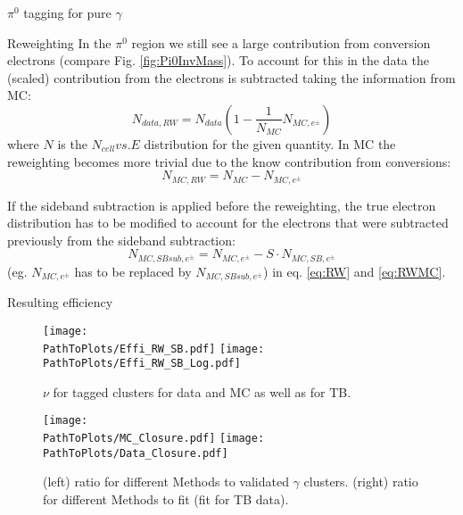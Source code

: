 \documentclass[ALICE]{ALICE_analysis_notes}
\newcommand{\PZ}{$\pi^0$\xspace}
\newcommand{\g}{$\gamma$\xspace}
\newcommand{\PathToPlots}{/home/joshua/PCG_Software/EMCal_NCellEffi/13TeVNomB_Wide/Pi0Tagging_13TeV_nom_04_26_WithTRD_WithBorderCells_1cellFT/pdf}
\begin{document}
\begin{section}{\PZ tagging for pure \g}
\begin{subsection}{Reweighting}
	In the \PZ region we still see a large contribution from conversion electrons (compare Fig. \ref{fig:Pi0InvMass}). To account for this in the data the (scaled) contribution from the electrons is subtracted taking the information from MC:
	\begin{equation}
		N_{data, RW} = N_{data} ( 1 - \frac{1}{N_{MC}} N_{MC, e^{\pm}} )
		\label{eq:RW}
	\end{equation}
	where $N$ is the $N_{cell} vs. E$ distribution for the given quantity.
	In MC the reweighting becomes more trivial due to the know contribution from conversions:
	\begin{equation}
	N_{MC, RW} = N_{MC} - N_{MC, e^{\pm}}
	\label{eq:RWMC}
	\end{equation}
	
	
	If the sideband subtraction is applied before the reweighting, the true electron distribution has to be modified to account for the electrons that were subtracted previously from the sideband subtraction: \\
	\begin{equation}
	N_{MC, SB sub, e^{\pm}} = N_{MC, e^{\pm}} - S \cdot N_{MC, SB, e^{\pm}}
	\end{equation}
	(eg. $N_{MC, e^{\pm}}$ has to be replaced by $N_{MC, SB sub, e^{\pm}}$) in eq. \ref{eq:RW} and \ref{eq:RWMC}.
	
	
	
\end{subsection}

\begin{subsection}{Resulting efficiency}
	
	\begin{figure}[ht!]
		\centering
		\texttt{[image: \\PathToPlots/Effi\_RW\_SB.pdf]}
		\texttt{[image: \\PathToPlots/Effi\_RW\_SB\_Log.pdf]}
		
		\caption{  $\nu$ for tagged clusters for data and MC as well as for TB.}
		\label{fig:NCellEff_Tagging2}
		
	\end{figure}
	
	\begin{figure}[ht!]
		\centering
		\texttt{[image: \\PathToPlots/MC\_Closure.pdf]}	
		\texttt{[image: \\PathToPlots/Data\_Closure.pdf]}	
		\caption{ (left) ratio for different Methods to validated \g clusters. (right) ratio for different Methods to fit (fit for TB data).}
		\label{fig:NCellEff_Tagging_Closure}
		

\end{figure}
\end{subsection}
\end{section}
\end{document}
